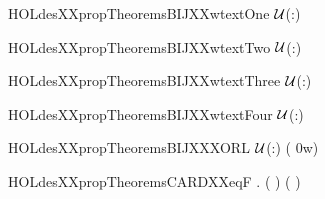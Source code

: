\newcommand{\HOLdesXXpropTheoremsBIJXXktox}{\UseVerbatim{HOLdesXXpropTheoremsBIJXXktox}}
\begin{SaveVerbatim}{HOLdesXXpropTheoremsBIJXXwtextOne}
\HOLTokenTurnstile{}    \ensuremath{{\cal{U}}}(:)
\end{SaveVerbatim}
\newcommand{\HOLdesXXpropTheoremsBIJXXwtextOne}{\UseVerbatim{HOLdesXXpropTheoremsBIJXXwtextOne}}
\begin{SaveVerbatim}{HOLdesXXpropTheoremsBIJXXwtextTwo}
\HOLTokenTurnstile{}    \ensuremath{{\cal{U}}}(:)
\end{SaveVerbatim}
\newcommand{\HOLdesXXpropTheoremsBIJXXwtextTwo}{\UseVerbatim{HOLdesXXpropTheoremsBIJXXwtextTwo}}
\begin{SaveVerbatim}{HOLdesXXpropTheoremsBIJXXwtextThree}
\HOLTokenTurnstile{}    \ensuremath{{\cal{U}}}(:)
\end{SaveVerbatim}
\newcommand{\HOLdesXXpropTheoremsBIJXXwtextThree}{\UseVerbatim{HOLdesXXpropTheoremsBIJXXwtextThree}}
\begin{SaveVerbatim}{HOLdesXXpropTheoremsBIJXXwtextFour}
\HOLTokenTurnstile{}    \ensuremath{{\cal{U}}}(:)
\end{SaveVerbatim}
\newcommand{\HOLdesXXpropTheoremsBIJXXwtextFour}{\UseVerbatim{HOLdesXXpropTheoremsBIJXXwtextFour}}
\begin{SaveVerbatim}{HOLdesXXpropTheoremsBIJXXXORL}
\HOLTokenTurnstile{}   \ensuremath{{\cal{U}}}(:) ( 0w)
\end{SaveVerbatim}
\newcommand{\HOLdesXXpropTheoremsBIJXXXORL}{\UseVerbatim{HOLdesXXpropTheoremsBIJXXXORL}}
\begin{SaveVerbatim}{HOLdesXXpropTheoremsCARDXXeqF}
\HOLTokenTurnstile{} \HOLSymConst{\HOLTokenForall{}} .  \HOLTokenLeftbrace{} \HOLTokenBar{}   \HOLSymConst{\HOLTokenEor{}}  ( \HOLSymConst{\HOLTokenEor{}}  ) \HOLSymConst{=} \HOLTokenRightbrace{} \HOLSymConst{=}  (  )
\end{SaveVerbatim}
\newcommand{\HOLdesXXpropTheoremsCARDXXeqF}{\UseVerbatim{HOLdesXXpropTheoremsCARDXXeqF}}
